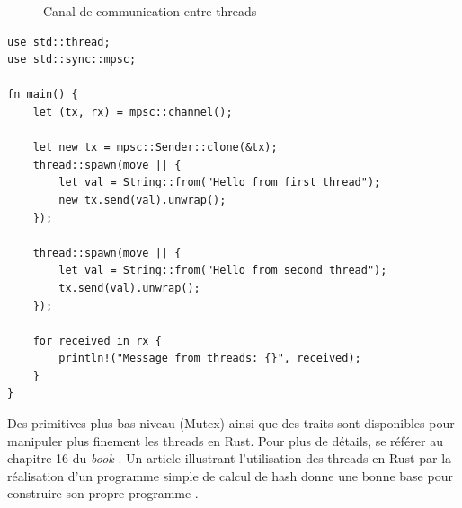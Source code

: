 \begin{figure}
    \begin{center}
    \end{center}
    \caption{Canal de communication entre threads - \cite{ref37}}
    \label{rust_channel}
\end{figure}
\bigbreak
\begin{code}
    \begin{verbatim}
use std::thread;
use std::sync::mpsc;

fn main() {
    let (tx, rx) = mpsc::channel();

    let new_tx = mpsc::Sender::clone(&tx);
    thread::spawn(move || {
        let val = String::from("Hello from first thread");
        new_tx.send(val).unwrap();
    });

    thread::spawn(move || {
        let val = String::from("Hello from second thread");
        tx.send(val).unwrap();
    });

    for received in rx {
        println!("Message from threads: {}", received);
    }
}
    \end{verbatim}
    \caption{\textit{Message passing} avec deux producteurs et un consommateur en Rust}
    \label{rust_thread_message}
\end{code}
\bigbreak
Des primitives plus bas niveau (Mutex) ainsi que des traits sont disponibles pour manipuler 
plus finement les threads en Rust. Pour plus de détails, se référer au chapitre 16 du \textit{book} \cite{ref0}.
Un article illustrant l'utilisation des threads en Rust par la réalisation d'un programme simple 
de calcul de hash donne une bonne base pour construire son propre programme \cite{ref37}.

